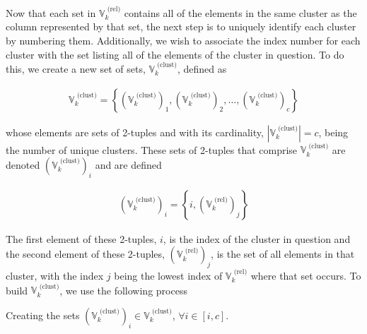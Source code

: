 \documentclass[../../ClusteringConnectionsMAIN.tex]{subfiles}
\begin{document}
\begin{flushleft}
\begin{large}

Now that each set in $\mathbb{V}_k^\text{ (rel)}$ contains all of the elements in the same cluster as the column represented by that set, the next step is to uniquely identify each cluster by numbering them.  Additionally, we wish to associate the index number for each cluster with the set listing all of the elements of the cluster in question.  To do this, we create a new set of sets, $\mathbb{V}_k^\text{ (clust)}$, defined as

\begin{align*}
\mathbb{V}_k^\text{ (clust)} = \left\{ \left( \mathbb{V}_k^\text{ (clust)} \right)_1, \left( \mathbb{V}_k^\text{ (clust)} \right)_2, \dots, \left( \mathbb{V}_k^\text{ (clust)} \right)_c \right\}
\end{align*}

whose elements are sets of 2-tuples and with its cardinality, $\left| \mathbb{V}_k^\text{ (clust)} \right| = c$, being the number of unique clusters.  These sets of 2-tuples that comprise $\mathbb{V}_k^\text{ (clust)}$ are denoted $\left( \mathbb{V}_k^\text{ (clust)} \right)_i$ and are defined 

\begin{align}
\left( \mathbb{V}_k^\text{ (clust)} \right)_i = \left\{ i, \left( \mathbb{V}_k^\text{ (rel)} \right)_j \right\}
\end{align}

The first element of these 2-tuples, $i$, is the index of the cluster in question and the second element of these 2-tuples, $\left( \mathbb{V}_k^\text{ (rel)} \right)_j$, is the set of all elements in that cluster, with the index $j$ being the lowest index of $\mathbb{V}_k^\text{ (rel)}$ where that set occurs.  To build $\mathbb{V}_k^\text{ (clust)}$, we use the following process

\begin{algorithm}
\caption{Creating the sets $\left( \mathbb{V}_k^\text{ (clust)} \right)_i \in \mathbb{V}_k^\text{ (clust)}$, $\forall i \in \left[ i, c \right]$.}
\end{algorithm}

\end{large}
\end{flushleft}
\end{document}

